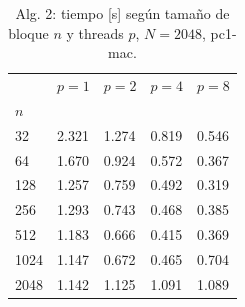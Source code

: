\begin{table}[H]
\centering\small
\caption{Alg. 2: tiempo [s] según tamaño de bloque $n$ y threads $p$, $N=2048$, pc1-mac.}
\label{tab:e_alg2_bloques_pc1-mac}
\begin{tabular}{lllll}
\toprule
 & $p=1$ & $p=2$ & $p=4$ & $p=8$ \\
$n$ &  &  &  &  \\
\midrule
32 & 2.321 & 1.274 & 0.819 & 0.546 \\
64 & 1.670 & 0.924 & 0.572 & 0.367 \\
128 & 1.257 & 0.759 & 0.492 & 0.319 \\
256 & 1.293 & 0.743 & 0.468 & 0.385 \\
512 & 1.183 & 0.666 & 0.415 & 0.369 \\
1024 & 1.147 & 0.672 & 0.465 & 0.704 \\
2048 & 1.142 & 1.125 & 1.091 & 1.089 \\
\bottomrule
\end{tabular}
\end{table}

